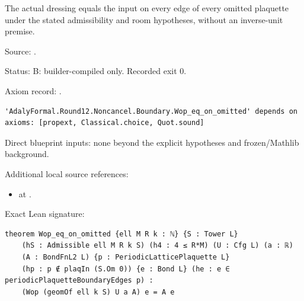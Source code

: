 \begin{theorem}[bp-203]
\label{bp-203}
\uses{}
\leanok
The actual dressing equals the input on every edge of every omitted plaquette under the stated admissibility and room hypotheses, without an inverse-unit premise.

\par Source: \texttt{}.
\par Status: B: builder-compiled only. Recorded exit 0.
\par Axiom record: \texttt{}.
\begin{verbatim}
'AdalyFormal.Round12.Noncancel.Boundary.Wop_eq_on_omitted' depends on axioms: [propext, Classical.choice, Quot.sound]
\end{verbatim}
\par Direct blueprint inputs: none beyond the explicit hypotheses and frozen/Mathlib background.
\par Additional local source references:
\begin{itemize}
\item \texttt{} at \texttt{}.
\end{itemize}
\par Exact Lean signature:
\begin{verbatim}
theorem Wop_eq_on_omitted {ell M R k : ℕ} {S : Tower L}
    (hS : Admissible ell M R k S) (h4 : 4 ≤ R*M) (U : Cfg L) (a : ℝ)
    (A : BondFnL2 L) {p : PeriodicLatticePlaquette L}
    (hp : p ∉ plaqIn (S.Om 0)) {e : Bond L} (he : e ∈ periodicPlaquetteBoundaryEdges p) :
    (Wop (geomOf ell k S) U a A) e = A e
\end{verbatim}
\end{theorem}

